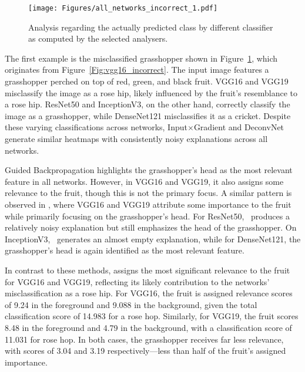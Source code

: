 \begin{figure}[ht!]
	\begin{center}
		\texttt{[image: Figures/all\_networks\_incorrect\_1.pdf]}
	\end{center}
	\caption{Analysis regarding the actually predicted class by different classifier as computed by the selected analysers.}
	\label{Fig:compare_models_same_missclassified_1}
\end{figure} 

The first example is the misclassified grasshopper shown in Figure~\ref{Fig:compare_models_same_missclassified_1}, which originates from Figure~\ref{Fig:vgg16_incorrect}. The input image features a grasshopper perched on top of red, green, and black fruit. VGG16 and VGG19 misclassify the image as a rose hip, likely influenced by the fruit’s resemblance to a rose hip. ResNet50 and InceptionV3, on the other hand, correctly classify the image as a grasshopper, while DenseNet121 misclassifies it as a cricket. Despite these varying classifications across networks, Input$\times$Gradient and DeconvNet generate similar heatmaps with consistently noisy explanations across all networks.

Guided Backpropagation highlights the grasshopper’s head as the most relevant feature in all networks. However, in VGG16 and VGG19, it also assigns some relevance to the fruit, though this is not the primary focus. A similar pattern is observed in \LRP\/, where VGG16 and VGG19 attribute some importance to the fruit while primarily focusing on the grasshopper’s head. For ResNet50, \LRP\ produces a relatively noisy explanation but still emphasizes the head of the grasshopper. On InceptionV3, \LRP\ generates an almost empty explanation, while for DenseNet121, the grasshopper's head is again identified as the most relevant feature.

In contrast to these methods, \CTC\/ assigns the most significant relevance to the fruit for VGG16 and VGG19, reflecting its likely contribution to the networks’ misclassification as a rose hip. For VGG16, the fruit is assigned relevance scores of 9.24 in the foreground and 9.088 in the background, given the total classification score of 14.983 for a rose hop. Similarly, for VGG19, the fruit scores 8.48 in the foreground and 4.79 in the background, with a classification score of 11.031 for rose hop. In both cases, the grasshopper receives far less relevance, with scores of 3.04 and 3.19 respectively—less than half of the fruit's assigned importance.


